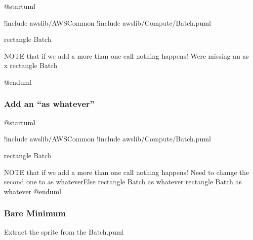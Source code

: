 \documentclass[letterpaper,10pt,english]{sphinxmanual}
\begin{document}
%
\begin{sphinxVerbatim}[commandchars=\\\{\},numbers=left,firstnumber=1,stepnumber=1]
@startuml 

!include \PYGZlt{}awslib/AWSCommon\PYGZgt{}
!include \PYGZlt{}awslib/Compute/Batch.puml\PYGZgt{}

rectangle \PYGZdq{}\PYGZlt{}\PYGZdl{}Batch\PYGZgt{}\PYGZdq{} 

\PYGZsq{}NOTE that if we add a more than one call \PYGZhy{} nothing happens! We\PYGZsq{}re missing an \PYGZdq{}as x\PYGZdq{}
rectangle \PYGZdq{}\PYGZlt{}\PYGZdl{}Batch\PYGZgt{}\PYGZdq{} 

@enduml
\end{sphinxVerbatim}
\sphinxresetverbatimhllines


\subsubsection{Add an “as whatever”}
\label{\detokenize{StdlibUnderTheHood/StdlibUnderstanding:add-an-as-whatever}}
\begin{figure}[htbp]
\centering

\end{figure}

%
\begin{sphinxVerbatim}[commandchars=\\\{\},numbers=left,firstnumber=1,stepnumber=1]
@startuml 

!include \PYGZlt{}awslib/AWSCommon\PYGZgt{}
!include \PYGZlt{}awslib/Compute/Batch.puml\PYGZgt{}

rectangle \PYGZdq{}\PYGZlt{}\PYGZdl{}Batch\PYGZgt{}\PYGZdq{} 

\PYGZsq{}NOTE that if we add a more than one call \PYGZhy{} nothing happens! Need to change the second one to \PYGZdq{}as whateverElse\PYGZdq{}
rectangle \PYGZdq{}\PYGZlt{}\PYGZdl{}Batch\PYGZgt{}\PYGZdq{} as whatever
rectangle \PYGZdq{}\PYGZlt{}\PYGZdl{}Batch\PYGZgt{}\PYGZdq{} as whatever
@enduml
\end{sphinxVerbatim}
\sphinxresetverbatimhllines


\subsubsection{Bare Minimum}
\label{\detokenize{StdlibUnderTheHood/StdlibUnderstanding:bare-minimum}}
Extract the sprite from the Batch.puml
\end{document}
